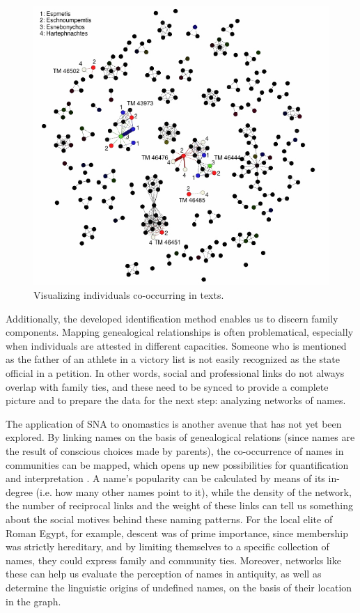 \documentclass[amsthm,ebook]{saparticle}
\begin{document}
\begin{figure}[!bp]
\centering
 \includegraphics[width=\columnwidth]{EAGLE2016FullPaperBroux-img001.jpg}
\caption{Visualizing individuals co-occurring in texts. }
\label{fig:1}
\end{figure}







Additionally, the developed identification method enables us to discern family components. Mapping genealogical
relationships is often problematical, especially when individuals are attested in different capacities. Someone who is
mentioned as the father of an athlete in a victory list is not easily recognized as the state official in a petition.
In other words, social and professional links do not always overlap with family ties, and these need to be synced to
provide a complete picture and to prepare the data for the next step: analyzing networks of names.

The application of SNA to onomastics is another avenue that has not yet been explored. By linking names on the basis of
genealogical relations (since names are the result of conscious choices made by parents), the co-occurrence of names in
communities can be mapped, which opens up new possibilities for quantification and interpretation \citep{Broux2015c}. A
name's popularity can be calculated by means of its in-degree (i.e. how many other names point to it), while the
density of the network, the number of reciprocal links and the weight of these links can tell us something about the
social motives behind these naming patterns. For the local elite of Roman Egypt, for example, descent was of prime
importance, since membership was strictly hereditary, and by limiting themselves to a specific collection of names,
they could express family and community ties. Moreover, networks like these can help us evaluate the perception of
names in antiquity, as well as determine the linguistic origins of undefined names, on the basis of their location in
the graph.
\end{document}
